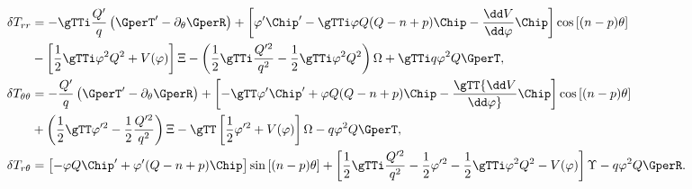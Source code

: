 \begin{equation}
\begin{aligned}
\delta T_{rr} & = -\gTTi \frac{Q'}{q}\left(\GperT' -
\partial_\theta \GperR \right) + \left[ \varphi' \Chip' - \gTTi
\varphi Q(Q-n+p) \Chip - {\dd V\over\dd\varphi} \Chip \right]
\cos\left[(n-p)\theta\right] \\ & - \left[\frac{1}{2} \gTTi \varphi^2
Q^2 + V(\varphi) \right] \Xi - \left(\frac{1}{2} \gTTi
\frac{Q'^2}{q^2} - \frac{1}{2} \gTTi \varphi^2 Q^2 \right) \Omega +
\gTTi q \varphi^2 Q \GperT ,\\ 
\delta T_{\theta \theta} & =
-\frac{Q'}{q} \left(\GperT' - \partial_\theta \GperR \right) +
\left[-\gTT \varphi' \Chip' + \varphi Q(Q-n+p) \Chip - \gTT {\dd
V\over\dd\varphi} \Chip \right] \cos\left[(n-p) \theta \right] \\ & +
\left(\frac{1}{2} \gTT \varphi'^2 - \frac{1}{2}
\frac{Q'^2}{q^2}\right) \Xi - \gTT \left[ \frac{1}{2} \varphi'^2 +
V(\varphi) \right] \Omega - q \varphi^2 Q \GperT,\\ 
\delta T_{r \theta} & = \left[-\varphi Q \Chip' + \varphi'(Q-n+p)
\Chip \right] \sin\left[(n-p)\theta\right] + \left[\frac{1}{2} \gTTi
\frac{Q'^2}{q^2} - \frac{1}{2} \varphi'^2 - \frac{1}{2} \gTTi
\varphi^2 Q^2 - V(\varphi) \right] \Upsilon - q \varphi^2 Q
\GperR.
\end{aligned}
\end{equation}


